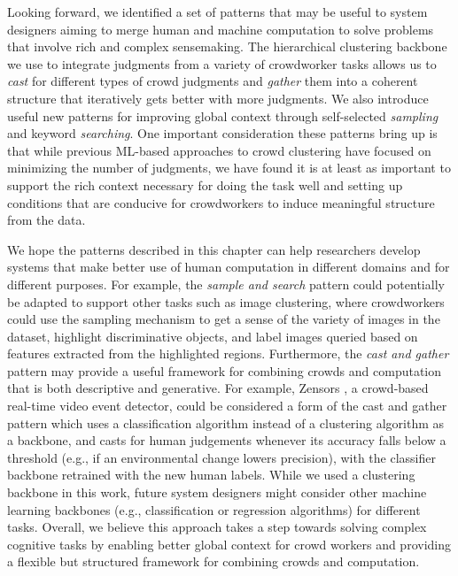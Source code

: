 Looking forward, we identified a set of patterns that may be useful to system designers
aiming to merge human and machine computation to solve problems that involve rich
and complex sensemaking.
The hierarchical clustering backbone we use to integrate judgments from a
variety of crowdworker tasks allows us to \textit{cast} for different types of
crowd judgments and \textit{gather} them into a coherent structure that
iteratively gets better with more judgments.  We also introduce useful new
patterns for improving global context through self-selected \emph{sampling} and
keyword \emph{searching}.  One important consideration these patterns bring up
is that while previous ML-based approaches to crowd clustering have focused on
minimizing the number of judgments, we have found it is at least as important
to support the rich context necessary for doing the task well and setting up
conditions that are conducive for crowdworkers to induce meaningful structure
from the data.


We hope the patterns described in this chapter can help researchers
develop systems that make better use of human computation in different domains and for different purposes. For example,
the \emph{sample and search} pattern could potentially be adapted to support other tasks such as image
clustering, where crowdworkers could use the sampling mechanism to
get a sense of the variety of images in the dataset, highlight discriminative objects, and label images queried based on features extracted from the highlighted regions. Furthermore, the \emph{cast and gather} 
pattern may provide a useful framework for combining
crowds and computation that is both descriptive and generative. For example, Zensors \cite{laput2015zensors}, a crowd-based real-time video event detector, could be considered a form of the cast and gather pattern which uses a classification algorithm instead of a clustering algorithm as a backbone, and casts for human judgements whenever its accuracy falls below a threshold (e.g., if an environmental change lowers precision), with the classifier backbone retrained with the new human labels. While we used a clustering backbone in this work, 
future system designers might consider other machine learning backbones (e.g., classification or regression algorithms) for different tasks. Overall, we believe this approach takes a step towards solving complex cognitive tasks by enabling better global context for crowd workers and providing a flexible but structured framework for combining crowds and computation.


